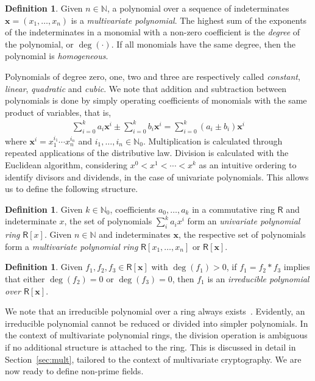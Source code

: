 \documentclass[12pt, a4paper, oneside]{memoir}
\theoremstyle{definition}
\newtheorem{definition}[theorem]{Definition}
\begin{document}
\begin{definition}
  Given $n \in \mathbb{N}$, a polynomial over a sequence of indeterminates $\mathbf{x} = (x_{1}, \dots, x_{n})$ is a \emph{multivariate polynomial}. The highest sum of the exponents of the indeterminates in a monomial with a non-zero coefficient is the \emph{degree} of the polynomial, or $\deg(\cdot)$. If all monomials have the same degree, then the polynomial is \emph{homogeneous}.
\end{definition}

Polynomials of degree zero, one, two and three are respectively called \emph{constant}, \emph{linear}, \emph{quadratic} and \emph{cubic}. We note that addition and subtraction between polynomials is done by simply operating coefficients of monomials with the same product of variables, that is,
\begin{align}
  \sum_{i = 0}^{k} a_{i} \mathbf{x}^{i} \pm \sum_{i = 0}^{k} b_{i} \mathbf{x}^{i} = \sum_{i = 0}^{k} (a_{i} \pm b_{i}) \mathbf{x}^{i}
\end{align}
where $\mathbf{x}^{i} = x_{1}^{i_{1}} \cdots x_{n}^{i_{n}}$ and $i_{1}, \dots, i_{n} \in \mathbb{N}_{0}$. Multiplication is calculated through repeated applications of the distributive law. Division is calculated with the Euclidean algorithm, considering $x^{0} < x^{1} < \cdots < x^{k}$ as an intuitive ordering to identify divisors and dividends, in the case of univariate polynomials. This allows us to define the following structure.

\begin{definition}
  Given $k \in \mathbb{N}_{0}$, coefficients $a_{0}, \dots, a_{k}$ in a commutative ring $\mathsf{R}$ and indeterminate $x$, the set of polynomials $\sum_{i}^{k} a_{i} x^{i}$ form an \emph{univariate polynomial ring} $\mathsf{R}[x]$. Given $n \in \mathbb{N}$ and indeterminates $\mathbf{x}$, the respective set of polynomials form a \emph{multivariate polynomial ring} $\mathsf{R}[x_{1}, \dots, x_{n}]$ or $\mathsf{R}[\mathbf{x}]$.
\end{definition}

\begin{definition}
  Given $f_{1}, f_{2}, f_{3} \in \mathsf{R}[\mathbf{x}]$ with $\deg(f_{1}) > 0$, if $f_{1} = f_{2} \ast f_{3}$ implies that either $\deg(f_{2}) = 0$ or $\deg(f_{3}) = 0$, then $f_{1}$ is an \emph{irreducible polynomial over $\mathsf{R}[\mathbf{x}]$}.
\end{definition}

We note that an irreducible polynomial over a ring always exists~\cite[Remark~2.1.25]{Mullen:2013}. Evidently, an irreducible polynomial cannot be reduced or divided into simpler polynomials. In the context of multivariate polynomial rings, the division operation is ambiguous if no additional structure is attached to the ring. This is discussed in detail in Section~\ref{sec:mult}, tailored to the context of multivariate cryptography. We are now ready to define non-prime fields.
\end{document}
